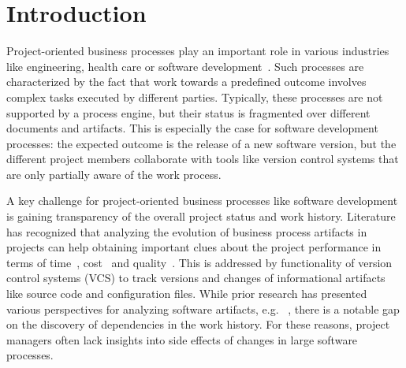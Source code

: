 \section{Introduction}

Project-oriented business processes play an important role in various industries like engineering, health care or software development~\cite{DBLP:conf/bpm/BalaCMRP15}. Such processes are characterized by the fact that work towards a predefined outcome involves complex tasks executed by different parties. Typically, these processes are not supported by a process engine, but their status is fragmented over different documents and artifacts.
This is especially the case for software development processes: the expected outcome is the release of a new software version, but the different project members collaborate with tools like version control systems that are only partially aware of the work process. %

A key challenge for project-oriented business processes like software development is gaining transparency of the overall project status and work history. Literature has recognized that analyzing the evolution of business process artifacts in projects can help obtaining important clues about the project performance in terms of time~\citep{Beheshti2016}, cost~\citep{DBLP:journals/cg/VoineaT07} and quality~\citep{Lindberg2016}. This is addressed by functionality of version control systems (VCS) to track versions and changes of informational artifacts like source code and configuration files. While prior research has presented various perspectives for analyzing software artifacts, e.g.~
\cite{Bani2016,Robles:2014:EDE:2597073.2597107,Mittal2014,Weicheng2013}, there is a notable gap on the discovery of dependencies in the work history. For these reasons, project managers often lack insights into side effects of changes in large software processes.

